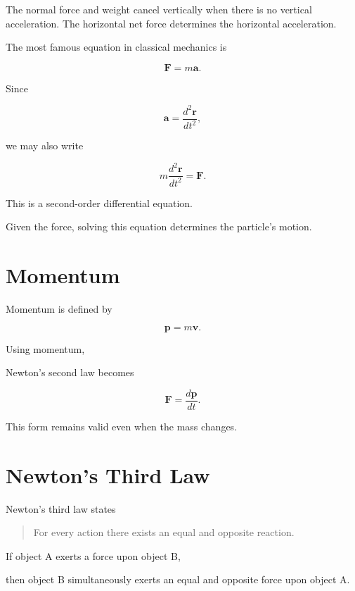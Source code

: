 \documentclass[11pt,a4paper,openany]{book}
\begin{document}
\begin{visualguidebox}
The normal force and weight cancel vertically when there is no vertical
acceleration. The horizontal net force determines the horizontal acceleration.
\end{visualguidebox}


The most famous equation in classical mechanics is

\[
\boxed{
	\mathbf F
	=
	m\mathbf a.
}
\]

Since

\[
\mathbf a
=
\frac{d^2\mathbf r}{dt^2},
\]

we may also write

\[
\boxed{
	m
	\frac{d^2\mathbf r}{dt^2}
	=
	\mathbf F.
}
\]

This is a second-order differential equation.

Given the force, solving this equation determines the particle's motion.


\section{Momentum}

Momentum is defined by

\[
\boxed{
	\mathbf p
	=
	m\mathbf v.
}
\]

Using momentum,

Newton's second law becomes

\[
\boxed{
	\mathbf F
	=
	\frac{d\mathbf p}{dt}.
}
\]

This form remains valid even when the mass changes.


\section{Newton's Third Law}

Newton's third law states

\begin{quote}
	For every action there exists an equal and opposite reaction.
\end{quote}

If object A exerts a force upon object B,

then object B simultaneously exerts an equal and opposite force upon object A.
\end{document}
